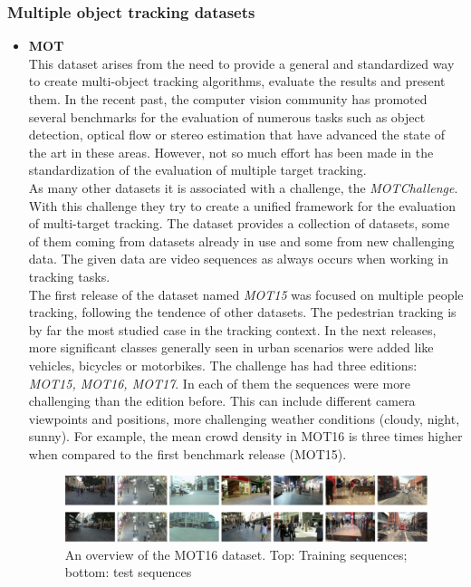 \subsubsection{Multiple object tracking datasets}
\begin{itemize}
\item \textbf{MOT} ~\cite{milan2016mot16}\\
This dataset arises from the need to provide a general and standardized way to create multi-object tracking algorithms, evaluate the results and present them. In the recent past, the computer vision community has promoted several benchmarks for the evaluation of numerous tasks such as object detection, optical flow or stereo estimation that have advanced the state of the art in these areas. However, not so much effort has been made in the standardization of the evaluation of multiple target tracking.\\
As many other datasets it is associated with a challenge, the \textit{MOTChallenge}. With this challenge they try to create a unified framework for the evaluation of multi-target tracking. The dataset provides a collection of datasets, some of them coming from datasets already in use and some from new challenging data. The given data are video sequences as always occurs when working in tracking tasks.\\
The first release of the dataset named \textit{MOT15} was focused on multiple people tracking, following the tendence of other datasets. The pedestrian tracking is by far the most studied case in the tracking context. In the next releases, more significant classes generally seen in urban scenarios were added like vehicles, bicycles or motorbikes. The challenge has had three editions: \textit{MOT15, MOT16, MOT17}. In each of them the sequences were more challenging than the edition before. This can include different camera viewpoints and positions, more challenging weather conditions (cloudy, night, sunny). For example, the mean crowd density in MOT16 is three times higher when compared to the first benchmark release (MOT15).
\begin{figure}[H]
\begin{center}
\includegraphics[scale=0.4]{mot16.png}
\caption{An overview of the MOT16 dataset. Top: Training sequences; bottom: test sequences ~\cite{milan2016mot16}}

\end{center}
\end{figure}
\end{itemize}
